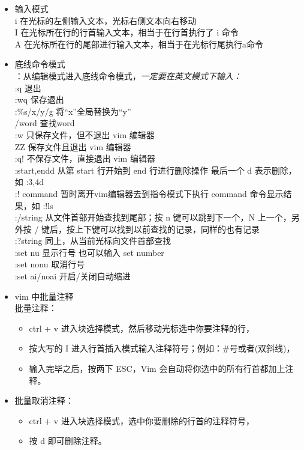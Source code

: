 \documentclass{ctexart}
\begin{document}
\begin{itemize}
    \item 输入模式
    \\ i \qquad 在光标的左侧输入文本，光标右侧文本向右移动
    \\ I \qquad 在光标所在行的行首输入文本，相当于在行首执行了 i 命令
    \\ A \qquad 在光标所在行的尾部进行输入文本，相当于在光标行尾执行a命令
    \item 底线命令模式
    \\ ：\qquad 从编辑模式进入底线命令模式，\emph{一定要在英文模式下输入：}
    \\ :q \qquad 退出
    \\ :wq \qquad 保存退出
    \\ :\%s/x/y/g  \qquad 将“x”全局替换为“y”
    \\ /word \qquad 查找word
    \\ :w 	\qquad 只保存文件，但不退出 vim 编辑器
    \\ ZZ  \qquad 保存文件且退出 vim 编辑器
    \\ :q! \qquad 不保存文件，直接退出 vim 编辑器
    \\ :start,endd  \qquad 从第 start 行开始到 end 行进行删除操作 最后一个 d 表示删除，如 :3,4d
    \\ :! command  \qquad 暂时离开vim编辑器去到指令模式下执行 command 命令显示结果，如 :!ls
    \\ :/string  \qquad 从文件首部开始查找到尾部；按 n 键可以跳到下一个，N 上一个，另外按 / 键后，按上下键可以找到以前查找的记录，同样的也有记录
    \\ :?string  	\qquad 同上，从当前光标向文件首部查找
    \\:set nu   	\qquad 显示行号 也可以输入 set number
    \\:set nonu    \qquad 取消行号
    \\:set ai/noai   \qquad 开启/关闭自动缩进

    \item vim 中批量注释
    \\批量注释：\begin{itemize}
        \item   ctrl + v 进入块选择模式，然后移动光标选中你要注释的行，
        \item  按大写的 I 进入行首插入模式输入注释符号；例如：\#号或者\/\/(双斜线)，
        \item  输入完毕之后，按两下 ESC，Vim 会自动将你选中的所有行首都加上注释。
    \end{itemize}


\item 批量取消注释：
\begin{itemize}
    \item  ctrl + v 进入块选择模式，选中你要删除的行首的注释符号，
    \item 按 d 即可删除注释。
\end{itemize}
\end{itemize}
\end{document}
